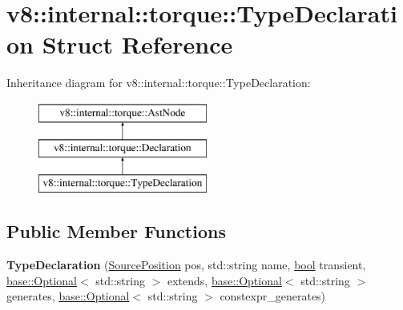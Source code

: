 \hypertarget{structv8_1_1internal_1_1torque_1_1TypeDeclaration}{}\section{v8\+:\+:internal\+:\+:torque\+:\+:Type\+Declaration Struct Reference}
\label{structv8_1_1internal_1_1torque_1_1TypeDeclaration}
Inheritance diagram for v8\+:\+:internal\+:\+:torque\+:\+:Type\+Declaration\+:\begin{figure}[H]
\begin{center}
\leavevmode
\includegraphics[height=3.000000cm]{structv8_1_1internal_1_1torque_1_1TypeDeclaration}
\end{center}
\end{figure}
\subsection*{Public Member Functions}
\begin{DoxyCompactItemize}
\item 
\mbox{\label{structv8_1_1internal_1_1torque_1_1TypeDeclaration_ad04e3acace912f71d88dddf79db5657c}} 
{\bfseries Type\+Declaration} (\mbox{\hyperlink{structv8_1_1internal_1_1torque_1_1SourcePosition}{Source\+Position}} pos, std\+::string name, \mbox{\hyperlink{classbool}{bool}} transient, \mbox{\hyperlink{classv8_1_1base_1_1Optional}{base\+::\+Optional}}$<$ std\+::string $>$ extends, \mbox{\hyperlink{classv8_1_1base_1_1Optional}{base\+::\+Optional}}$<$ std\+::string $>$ generates, \mbox{\hyperlink{classv8_1_1base_1_1Optional}{base\+::\+Optional}}$<$ std\+::string $>$ constexpr\+\_\+generates)
\end{DoxyCompactItemize}
